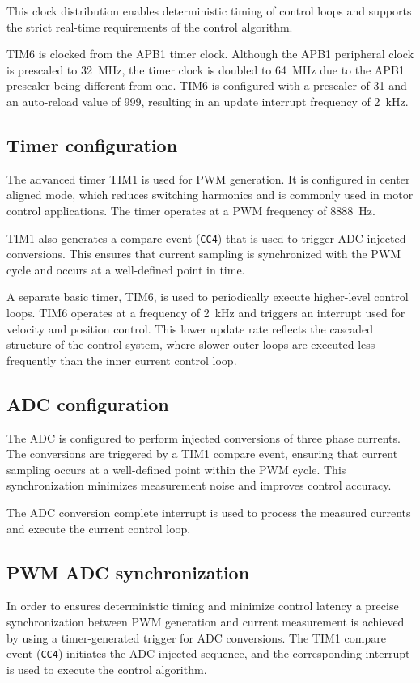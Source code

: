 This clock distribution enables deterministic timing of control loops and supports the strict real-time requirements of the control algorithm.

TIM6 is clocked from the APB1 timer clock. Although the APB1 peripheral clock is prescaled to 32~MHz, the timer clock is doubled to 64~MHz due to the APB1 prescaler being different from one. TIM6 is configured with a prescaler of 31 and an auto-reload value of 999, resulting in an update interrupt frequency of 2~kHz.


\subsection{Timer configuration}
The advanced timer TIM1 is used for PWM generation. It is configured in center aligned mode, 
which reduces switching harmonics and is commonly used in motor control applications. 
The timer operates at a PWM frequency of 8888~Hz. 

TIM1 also generates a compare event (\texttt{CC4}) that is used to trigger ADC injected conversions. 
This ensures that current sampling is synchronized with the PWM cycle and occurs at a well-defined point in time.

A separate basic timer, TIM6, is used to periodically execute higher-level control loops. 
TIM6 operates at a frequency of 2~kHz and triggers an interrupt used for velocity and position control. 
This lower update rate reflects the cascaded structure of the control system, 
where slower outer loops are executed less frequently than the inner current control loop.

\subsection{ADC configuration}
The ADC is configured to perform injected conversions of three phase currents.
The conversions are triggered by a TIM1 compare event, ensuring that current sampling occurs 
at a well-defined point within the PWM cycle. This synchronization minimizes measurement noise and improves control accuracy.

The ADC conversion complete interrupt is used to process the measured currents and execute the current control loop.

\subsection{PWM ADC synchronization}
In order to ensures deterministic timing and minimize control latency
a precise synchronization between PWM generation and current measurement is achieved by using a timer-generated trigger for ADC conversions.
The TIM1 compare event (\texttt{CC4}) initiates the ADC injected sequence, and the corresponding interrupt is used to execute the control algorithm.

